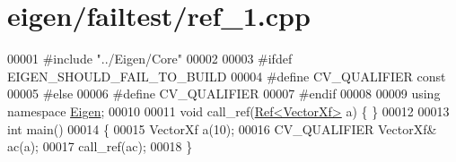 \hypertarget{eigen_2failtest_2ref__1_8cpp_source}{}\section{eigen/failtest/ref\+\_\+1.cpp}
\label{eigen_2failtest_2ref__1_8cpp_source}

\begin{DoxyCode}
00001 \textcolor{preprocessor}{#include "../Eigen/Core"}
00002 
00003 \textcolor{preprocessor}{#ifdef EIGEN\_SHOULD\_FAIL\_TO\_BUILD}
00004 \textcolor{preprocessor}{#define CV\_QUALIFIER const}
00005 \textcolor{preprocessor}{#else}
00006 \textcolor{preprocessor}{#define CV\_QUALIFIER}
00007 \textcolor{preprocessor}{#endif}
00008 
00009 \textcolor{keyword}{using namespace }\hyperlink{namespace_eigen}{Eigen};
00010 
00011 \textcolor{keywordtype}{void} call\_ref(\hyperlink{group___core___module_class_eigen_1_1_ref}{Ref<VectorXf>} a) \{ \}
00012 
00013 \textcolor{keywordtype}{int} main()
00014 \{
00015   VectorXf a(10);
00016   CV\_QUALIFIER VectorXf& ac(a);
00017   call\_ref(ac);
00018 \}
\end{DoxyCode}

